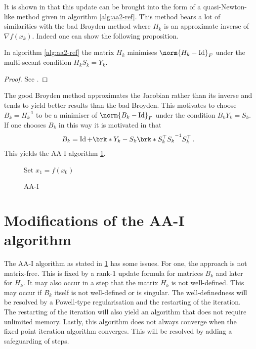 It is shown in \cite[Section 2.2]{ZhaAA} that this update can be brought into the form of a quasi-Newton-like method given in algorithm \ref{alg:aa2-ref}. This method bears a lot of similarities with the bad Broyden method where $H_k$ is an approximate inverse of $\nabla f(x_k)$. Indeed one can show the following proposition.
\begin{proposition}
	In algorithm \ref{alg:aa2-ref} the matrix $H_k$ minimises $\norm{H_k-\Id}_F$ under the multi-secant condition $H_kS_k=Y_k$.
\end{proposition}
\begin{proof}
	See \cite[Section 2.2]{ZhaAA}.
\end{proof}
The good Broyden method approximates the Jacobian rather than its inverse and tends to yield better results than the bad Broyden. This motivates to choose  $B_k=H_k^{-1}$ to be a minimiser of $\norm{B_k-\Id}_F$ under the condition $B_kY_k=S_k$.
If one chooses $B_k$ in this way it is motivated in \cite[Section 2.3]{ZhaAA} that
\begin{align*}
	B_k = \Id+\brk*{Y_k-S_k}\brk*{S_k^\top S_k}^{-1}S_k^\top\,.
\end{align*}
This yields the AA-I algorithm \ref{alg:aa1}.

\begin{figure}
\centering
\begin{algorithm}[H]
\caption{AA-I}
\label{alg:aa1}

\BlankLine
Set $x_1=f(x_0)$

\end{algorithm}
\end{figure}

\newpage
\section{Modifications of the AA-I algorithm}

The AA-I algorithm as stated in \ref{alg:aa1} has some issues. For one, the approach is not matrix-free. This is fixed by a rank-1 update formula for matrices $B_k$ and later for $H_k$. It may also occur in a step that the matrix $H_k$ is not well-defined. This may occur if $B_k$ itself is not well-defined or is singular. The well-definedness will be resolved by a Powell-type regularisation and the restarting of the iteration. The restarting of the iteration will also yield an algorithm that does not require unlimited memory. Lastly, this algorithm does not always converge when the fixed point iteration algorithm converges. This will be resolved by adding a safeguarding of steps.
	
